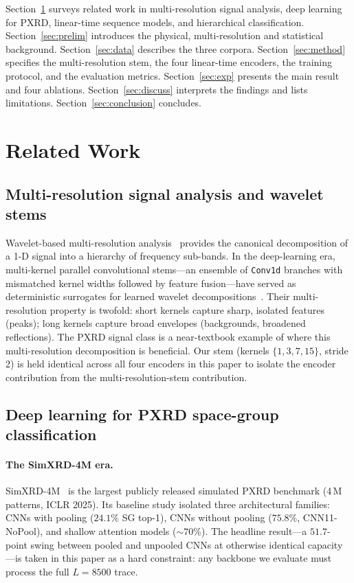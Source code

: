 \documentclass[final]{ws-ijwmip}
\begin{document}
Section~\ref{sec:related} surveys related work in multi-resolution signal
analysis, deep learning for PXRD, linear-time sequence models, and
hierarchical classification. Section~\ref{sec:prelim} introduces the
physical, multi-resolution and statistical background.
Section~\ref{sec:data} describes the three corpora.
Section~\ref{sec:method} specifies the multi-resolution stem, the four
linear-time encoders, the training protocol, and the evaluation
metrics. Section~\ref{sec:exp} presents the main result and four
ablations. Section~\ref{sec:discuss} interprets the findings and lists
limitations. Section~\ref{sec:conclusion} concludes.



\section{Related Work}
\label{sec:related}


\subsection{Multi-resolution signal analysis and wavelet stems}

Wavelet-based multi-resolution analysis~\cite{daubechies1992,mallat1999}
provides the canonical decomposition of a 1-D signal into a hierarchy of
frequency sub-bands. In the deep-learning era, multi-kernel parallel
convolutional stems---an ensemble of \texttt{Conv1d} branches with
mismatched kernel widths followed by feature fusion---have served as
deterministic surrogates for learned wavelet
decompositions~\cite{caobin2025simxrd, anonymous2019multikernelecg,
anonymous2020multiscaleseismic}.
Their multi-resolution property is twofold: short kernels capture sharp,
isolated features (peaks); long kernels capture broad envelopes
(backgrounds, broadened reflections). The PXRD signal class is a
near-textbook example of where this multi-resolution decomposition is
beneficial. Our stem (kernels $\{1,3,7,15\}$, stride 2) is held identical
across all four encoders in this paper to isolate the encoder
contribution from the multi-resolution-stem contribution.


\subsection{Deep learning for PXRD space-group classification}

\paragraph{The SimXRD-4M era.}
SimXRD-4M~\cite{caobin2025simxrd} is the largest publicly released
simulated PXRD benchmark (4\,M patterns, ICLR 2025). Its baseline study
isolated three architectural families: CNNs with pooling
($24.1\%$ SG top-1), CNNs without pooling ($75.8\%$, CNN11-NoPool), and
shallow attention models ($\sim 70\%$). The headline result---a
$51.7$-point swing between pooled and unpooled CNNs at otherwise
identical capacity---is taken in this paper as a hard constraint: any
backbone we evaluate must process the full $L=8500$ trace.
\end{document}

